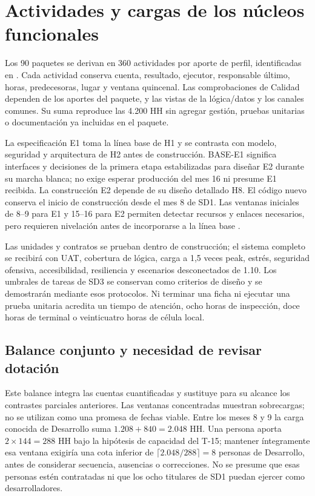 \section{Actividades y cargas de los núcleos funcionales}
Los 90 paquetes se derivan en 360 actividades por aporte de perfil, identificadas en . Cada actividad conserva cuenta, resultado, ejecutor, responsable último, horas, predecesoras, lugar y ventana quincenal. Las comprobaciones de Calidad dependen de los aportes del paquete, y las vistas de la lógica/datos y los canales comunes. Su suma reproduce las 4.200 HH sin agregar gestión, pruebas unitarias o documentación ya incluidas en el paquete.

La especificación E1 toma la línea base de H1 y se contrasta con modelo, seguridad y arquitectura de H2 antes de construcción. BASE-E1 significa interfaces y decisiones de la primera etapa estabilizadas para diseñar E2 durante su marcha blanca; no exige esperar producción del mes 16 ni presume E1 recibida. La construcción E2 depende de su diseño detallado H8. El código nuevo conserva el inicio de construcción desde el mes 8 de SD1. Las ventanas iniciales de 8--9 para E1 y 15--16 para E2 permiten detectar recursos y enlaces necesarios, pero requieren nivelación antes de incorporarse a la línea base \parencite[art.~17; Formulario~E-25; pp.~12--74]{bases-admin}.

Las unidades y contratos se prueban dentro de construcción; el sistema completo se recibirá con UAT, cobertura de lógica, carga a 1,5 veces peak, estrés, seguridad ofensiva, accesibilidad, resiliencia y escenarios desconectados de 1.10. Los umbrales de tareas de SD3 se conservan como criterios de diseño y se demostrarán mediante esos protocolos. Ni terminar una ficha ni ejecutar una prueba unitaria acredita un tiempo de atención, ocho horas de inspección, doce horas de terminal o veinticuatro horas de célula local.



\subsection{Balance conjunto y necesidad de revisar dotación}


Este balance integra las cuentas cuantificadas y sustituye para su alcance los contrastes parciales anteriores. Las ventanas concentradas muestran sobrecargas; no se utilizan como una promesa de fechas viable. Entre los meses 8 y 9 la carga conocida de Desarrollo suma $1.208+840=2.048$ HH. Una persona aporta $2\times144=288$ HH bajo la hipótesis de capacidad del T-15; mantener íntegramente esa ventana exigiría una cota inferior de $\lceil2.048/288\rceil=8$ personas de Desarrollo, antes de considerar secuencia, ausencias o correcciones. No se presume que esas personas estén contratadas ni que los ocho titulares de SD1 puedan ejercer como desarrolladores.

